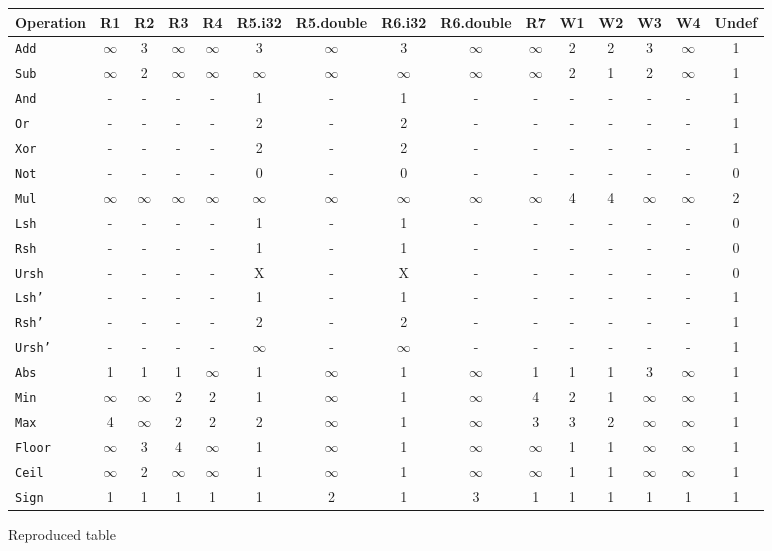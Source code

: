 \documentclass{article}
\begin{document}
\newcommand\oo{$\infty$}
\begin{figure}[t]
\small
\centering
\begin{tabular}{lccccccccc|cccc|c} \toprule
Operation &    \textbf{R1} & \textbf{R2} & \textbf{R3} & \textbf{R4} & \textbf{R5.i32} & \textbf{R5.double} & \textbf{R6.i32} & \textbf{R6.double} & \textbf{R7} & \textbf{W1} & \textbf{W2} & \textbf{W3} & \textbf{W4} & \textbf{Undef} \\ 
\midrule
\texttt{Add} & \oo & 3 & \oo & \oo & 3 & \oo & 3 & \oo & \oo & 2 & 2 & 3 & \oo & 1 \\
\texttt{Sub} & \oo & 2 & \oo & \oo & \oo & \oo & \oo & \oo & \oo & 2 & 1 & 2 & \oo & 1 \\
\texttt{And} & -  & -  & -  & -  & 1 & -  & 1 & -  & -  & -  & -  & -  & -  & 1 \\
\texttt{Or} & -  & -  & -  & -  & 2 & -  & 2 & -  & -  & -  & -  & -  & -  & 1 \\
\texttt{Xor} & -  & -  & -  & -  & 2 & -  & 2 & -  & -  & -  & -  & -  & -  & 1 \\
\texttt{Not} & -  & -  & -  & -  & 0 & -  & 0 & -  & -  & -  & -  & -  & -  & 0 \\
\texttt{Mul} & \oo & \oo & \oo & \oo & \oo & \oo & \oo & \oo & \oo & 4 & 4 & \oo & \oo & 2 \\
\texttt{Lsh} & -  & -  & -  & -  & 1 & -  & 1 & -  & -  & -  & -  & -  & -  & 0 \\
\texttt{Rsh} & -  & -  & -  & -  & 1 & -  & 1 & -  & -  & -  & -  & -  & -  & 0 \\
\texttt{Ursh} & -  & -  & -  & -  & X & -  & X & -  & -  & -  & -  & -  & -  & 0 \\
\texttt{Lsh'} & -  & -  & -  & -  & 1 & -  & 1 & -  & -  & -  & -  & -  & -  & 1 \\
\texttt{Rsh'} & -  & -  & -  & -  & 2 & -  & 2 & -  & -  & -  & -  & -  & -  & 1 \\
\texttt{Ursh'} & -  & -  & -  & -  & \oo & -  & \oo & -  & -  & -  & -  & -  & -  & 1 \\
\texttt{Abs} & 1 & 1 & 1 & \oo & 1 & \oo & 1 & \oo & 1 & 1 & 1 & 3 & \oo & 1 \\
\texttt{Min} & \oo & \oo & 2 & 2 & 1 & \oo & 1 & \oo & 4 & 2 & 1 & \oo & \oo & 1 \\
\texttt{Max} & 4 & \oo & 2 & 2 & 2 & \oo & 1 & \oo & 3 & 3 & 2 & \oo & \oo & 1 \\
\texttt{Floor} & \oo & 3 & 4 & \oo & 1 & \oo & 1 & \oo & \oo & 1 & 1 & \oo & \oo & 1 \\
\texttt{Ceil} & \oo & 2 & \oo & \oo & 1 & \oo & 1 & \oo & \oo & 1 & 1 & \oo & \oo & 1 \\
\texttt{Sign} & 1 & 1 & 1 & 1 & 1 & 2 & 1 & 3 & 1 & 1 & 1 & 1 & 1 & 1 \\
\end{tabular}
\vspace*{-3.5mm}
\caption{Reproduced table}
\end{figure}
\end{document}
